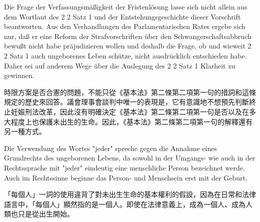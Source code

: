 \documentclass[12pt]{article}
\begin{document}
\syncleft
\begin{sourcepara}
Die Frage der Verfassungsmäßigkeit der Fristenlösung lasse sich nicht allein aus dem Wortlaut des \abbrArt{} 2 \abbrAbs{} 2 Satz 1 \abbrGG{}\ggfnArtTwoTwoOneDE{} und der Entstehungsgeschichte dieser Vorschrift beantworten. Aus den Verhandlungen des Parlamentarischen Rates ergebe sich nur, daß er eine Reform der Strafvorschriften über den Schwangerschaftsabbruch bewußt nicht habe präjudizieren wollen und deshalb die Frage, ob und wieweit \abbrArt{} 2 \abbrAbs{} 2 Satz 1 \abbrGG{}\ggfnArtTwoTwoOneDE{} auch ungeborenes Leben schütze, nicht ausdrücklich entschieden habe. Daher sei auf anderem Wege über die Auslegung des \abbrArt{} 2 \abbrAbs{} 2 Satz 1 \abbrGG{}\ggfnArtTwoTwoOneDE{} Klarheit zu gewinnen.
\end{sourcepara}
\begin{transpara}
時限方案是否合憲的問題，不能只從《基本法》第二條第二項第一句\ggfnArtTwoTwoOneZH{}的措詞和這條規定的歷史來回答。議會理事會談判中唯一的表現是，它有意識地不想預先判斷終止妊娠刑法改革，因此沒有明確決定《基本法》第二條第二項第一句\ggfnArtTwoTwoOneZH{}是否以及在多大程度上也保護未出生的生命。因此，《基本法》第二條第二項第一句\ggfnArtTwoTwoOneZH{}的解釋還有另一種方式。
\end{transpara}

\syncleft
\begin{sourcepara}
Die Verwendung des Wortes "jeder" spreche gegen die Annahme eines Grundrechts des ungeborenen Lebens, da sowohl in der Umgangs- wie auch in der Rechtssprache mit "jeder" eindeutig eine menschliche Person bezeichnet werde. Auch im Rechtssinne beginne das Person- und Menschsein erst mit der Geburt.
\end{sourcepara}
\begin{transpara}
「每個人」一詞的使用違背了對未出生生命的基本權利的假設，因為在日常和法律語言中，「每個人」顯然指的是一個人。即使在法律意義上，成為一個人、成為人類也只是從出生開始。
\end{transpara}
\end{document}
